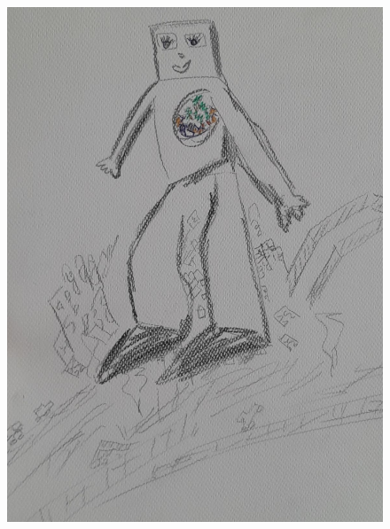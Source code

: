 \documentclass[12pt, a4paper, twoside]{book} %
\begin{document}
\begin{figure}[H]
	\centering
	\includegraphics[width=\textwidth]{./images/1f81324df12268.jpg}
\end{figure}
\end{document}

